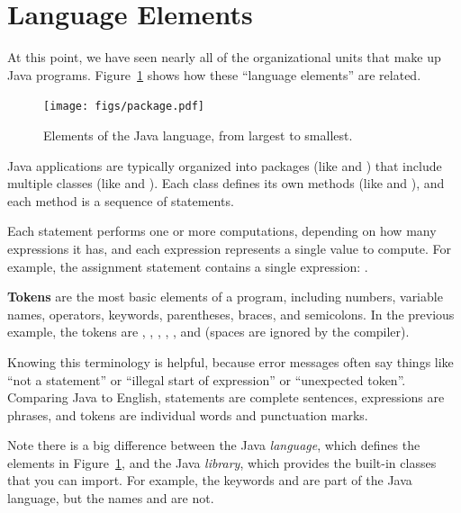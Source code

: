 \section{Language Elements}


At this point, we have seen nearly all of the organizational units that make up Java programs.
Figure~\ref{fig.package} shows how these ``language elements'' are related.

\begin{figure}[!ht]
\begin{center}
\texttt{[image: figs/package.pdf]}
\caption{Elements of the Java language, from largest to smallest.}
\label{fig.package}
\end{center}
\end{figure}


Java applications are typically organized into packages (like  and ) that include multiple classes (like  and ).
Each class defines its own methods (like  and ), and each method is a sequence of statements.

Each statement performs one or more computations, depending on how many expressions it has, and each expression represents a single value to compute.
For example, the assignment statement  contains a single expression: .

{\bf Tokens} are the most basic elements of a program, including numbers, variable names, operators, keywords, parentheses, braces, and semicolons.
In the previous example, the tokens are , \java{=}, , \java{/}, , and \java{;} (spaces are ignored by the compiler).


Knowing this terminology is helpful, because error messages often say things like ``not a statement'' or ``illegal start of expression'' or ``unexpected token''.
Comparing Java to English, statements are complete sentences, expressions are phrases, and tokens are individual words and punctuation marks.

Note there is a big difference between the Java {\em language}, which defines the elements in Figure~\ref{fig.package}, and the Java {\em library}, which provides the built-in classes that you can import.
For example, the keywords  and  are part of the Java language, but the names  and  are not.

